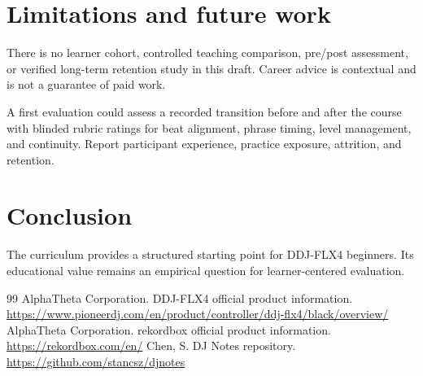 \documentclass[11pt]{article}
\begin{document}
\section{Limitations and future work}
There is no learner cohort, controlled teaching comparison, pre/post assessment, or verified long-term retention study in this draft. Career advice is contextual and is not a guarantee of paid work.\par
A first evaluation could assess a recorded transition before and after the course with blinded rubric ratings for beat alignment, phrase timing, level management, and continuity. Report participant experience, practice exposure, attrition, and retention.\par
\section{Conclusion}
The curriculum provides a structured starting point for DDJ-FLX4 beginners. Its educational value remains an empirical question for learner-centered evaluation.\par
\begin{thebibliography}{99}
 AlphaTheta Corporation. DDJ-FLX4 official product information. \url{https://www.pioneerdj.com/en/product/controller/ddj-flx4/black/overview/}
 AlphaTheta Corporation. rekordbox official product information. \url{https://rekordbox.com/en/}
 Chen, S. DJ Notes repository. \url{https://github.com/stancsz/djnotes}
\end{thebibliography}
\end{document}
